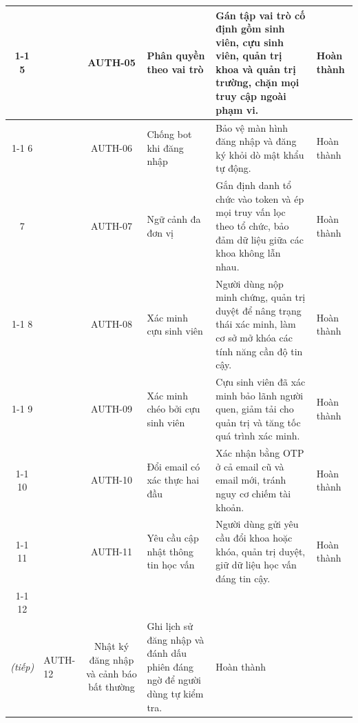 \documentclass[12pt,a4paper,oneside]{report}
\begin{document}
\begin{longtable}{|c|>{\raggedright\arraybackslash}p{2.5cm}|c|>{\raggedright\arraybackslash}p{3.1cm}|>{\raggedright\arraybackslash}p{5.0cm}|>{\raggedright\arraybackslash}p{1.9cm}|}
\cline{1-1}\cline{3-6}
\cellcolor{oldrow}5 & \cellcolor{oldrow} & \cellcolor{oldrow}AUTH-05 & \cellcolor{oldrow}Phân quyền theo vai trò & \cellcolor{oldrow}Gán tập vai trò cố định gồm sinh viên, cựu sinh viên, quản trị khoa và quản trị trường, chặn mọi truy cập ngoài phạm vi. & \cellcolor{oldrow}Hoàn thành \\
\cline{1-1}\cline{3-6}
\cellcolor{oldrow}6 & \multirow{-6}{2.4cm}{\cellcolor{oldrow}\textbf{Xác thực, phân quyền}} & \cellcolor{oldrow}AUTH-06 & \cellcolor{oldrow}Chống bot khi đăng nhập & \cellcolor{oldrow}Bảo vệ màn hình đăng nhập và đăng ký khỏi dò mật khẩu tự động. & \cellcolor{oldrow}Hoàn thành \\
\hline
\cellcolor{oldrow}7 & \cellcolor{oldrow} & \cellcolor{oldrow}AUTH-07 & \cellcolor{oldrow}Ngữ cảnh đa đơn vị & \cellcolor{oldrow}Gắn định danh tổ chức vào token và ép mọi truy vấn lọc theo tổ chức, bảo đảm dữ liệu giữa các khoa không lẫn nhau. & \cellcolor{oldrow}Hoàn thành \\
\cline{1-1}\cline{3-6}
\cellcolor{oldrow}8 & \cellcolor{oldrow} & \cellcolor{oldrow}AUTH-08 & \cellcolor{oldrow}Xác minh cựu sinh viên & \cellcolor{oldrow}Người dùng nộp minh chứng, quản trị duyệt để nâng trạng thái xác minh, làm cơ sở mở khóa các tính năng cần độ tin cậy. & \cellcolor{oldrow}Hoàn thành \\
\cline{1-1}\cline{3-6}
\cellcolor{oldrow}9 & \cellcolor{oldrow} & \cellcolor{oldrow}AUTH-09 & \cellcolor{oldrow}Xác minh chéo bởi cựu sinh viên & \cellcolor{oldrow}Cựu sinh viên đã xác minh bảo lãnh người quen, giảm tải cho quản trị và tăng tốc quá trình xác minh. & \cellcolor{oldrow}Hoàn thành \\
\cline{1-1}\cline{3-6}
\cellcolor{oldrow}10 & \cellcolor{oldrow} & \cellcolor{oldrow}AUTH-10 & \cellcolor{oldrow}Đổi email có xác thực hai đầu & \cellcolor{oldrow}Xác nhận bằng OTP ở cả email cũ và email mới, tránh nguy cơ chiếm tài khoản. & \cellcolor{oldrow}Hoàn thành \\
\cline{1-1}\cline{3-6}
\cellcolor{oldrow}11 & \cellcolor{oldrow} & \cellcolor{oldrow}AUTH-11 & \cellcolor{oldrow}Yêu cầu cập nhật thông tin học vấn & \cellcolor{oldrow}Người dùng gửi yêu cầu đổi khoa hoặc khóa, quản trị duyệt, giữ dữ liệu học vấn đáng tin cậy. & \cellcolor{oldrow}Hoàn thành \\
\cline{1-1}\cline{3-6}
\cellcolor{oldrow}12 & \multirow{-6}{2.4cm}{\cellcolor{oldrow}\textbf{Xác thực, phân quyền\\\textit{(tiếp)}}} & \cellcolor{oldrow}AUTH-12 & \cellcolor{oldrow}Nhật ký đăng nhập và cảnh báo bất thường & \cellcolor{oldrow}Ghi lịch sử đăng nhập và đánh dấu phiên đáng ngờ để người dùng tự kiểm tra. & \cellcolor{oldrow}Hoàn thành \\

\end{longtable}
\end{document}
